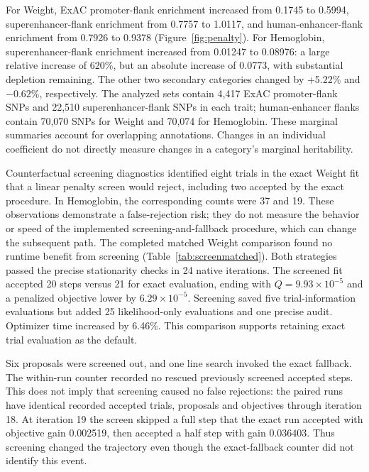 \documentclass[11pt]{article}
\begin{document}
\begingroup{}
For Weight, ExAC promoter-flank enrichment increased from 0.1745 to 0.5994, superenhancer-flank enrichment from 0.7757 to 1.0117, and human-enhancer-flank enrichment from 0.7926 to 0.9378 (Figure~\ref{fig:penalty}). For Hemoglobin, superenhancer-flank enrichment increased from 0.01247 to 0.08976: a large relative increase of 620\%, but an absolute increase of 0.0773, with substantial depletion remaining. The other two secondary categories changed by +5.22\% and $-0.62$\%, respectively. The analyzed sets contain 4,417 ExAC promoter-flank SNPs and 22,510 superenhancer-flank SNPs in each trait; human-enhancer flanks contain 70,070 SNPs for Weight and 70,074 for Hemoglobin. These marginal summaries account for overlapping annotations. Changes in an individual coefficient do not directly measure changes in a category's marginal heritability.\par\endgroup

Counterfactual screening diagnostics identified eight trials in the exact Weight fit that a linear penalty screen would reject, including two accepted by the exact procedure. In Hemoglobin, the corresponding counts were 37 and 19. These observations demonstrate a false-rejection risk; they do not measure the behavior or speed of the implemented screening-and-fallback procedure, which can change the subsequent path. The completed matched Weight comparison found no runtime benefit from screening (Table~\ref{tab:screenmatched}). Both strategies passed the precise stationarity checks in 24 native iterations. The screened fit accepted 20 steps versus 21 for exact evaluation, ending with $Q=9.93\times10^{-5}$ and a penalized objective lower by $6.29\times10^{-5}$. Screening saved five trial-information evaluations but added 25 likelihood-only evaluations and one precise audit. Optimizer time increased by 6.46\%. This comparison supports retaining exact trial evaluation as the default.

\begin{table}[H]
\centering\small

\caption{Exact versus linear-screen trial evaluation for the matched penalized Weight fit. Both strategies use the same AI implementation and starting point. Precise passes are included in the full-pass count. Timings include the final precise calculation.}
\label{tab:screenmatched}
\end{table}

Six proposals were screened out, and one line search invoked the exact fallback. The within-run counter recorded no rescued previously screened accepted steps. This does not imply that screening caused no false rejections: the paired runs have identical recorded accepted trials, proposals and objectives through iteration 18. At iteration 19 the screen skipped a full step that the exact run accepted with objective gain 0.002519, then accepted a half step with gain 0.036403. Thus screening changed the trajectory even though the exact-fallback counter did not identify this event.
\end{document}
